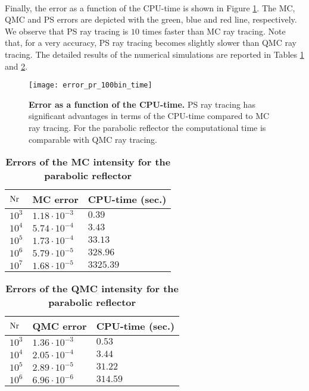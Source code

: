 \\ \indent
Finally, the error as a function of the CPU-time is shown in Figure \ref{fig:error_time_pr}. The MC, QMC and PS errors are depicted with the green, blue and red line, respectively. We observe that PS ray tracing is $10$ times faster than MC ray tracing. Note that, for a very accuracy, PS ray tracing becomes slightly slower than QMC ray tracing. The detailed results of the numerical simulations are reported in Tables \ref{tab:mc_error_pr_triangulation} and \ref{tab:QMC_error_pr_triangulation}.
\begin{figure}[h!]
  \center
  \texttt{[image: error\_pr\_100bin\_time]}
  \caption{\textbf{Error as a function of the CPU-time.} PS ray tracing has significant advantages in terms of the CPU-time compared to MC ray tracing. For the parabolic reflector the computational time is comparable with QMC ray tracing.}
  \label{fig:error_time_pr}
\end{figure} 
\begin{table}[ht] 
\centering
\caption{\bf Errors of the MC intensity for the parabolic reflector}
\begin{tabular}{lll}
 \hline   $\textrm{Nr}$ & MC error & CPU-time (sec.) \\
  \hline 
 $10^3$     & $1.18\cdot10^{-3}$ & $0.39$\\
 $10^4$     & $5.74\cdot 10^{-4}$ & $3.43$ \\
 $10^5$     & $1.73\cdot 10^{-4}$ & $33.13$\\
 $10^6$     & $5.79\cdot 10^{-5}$ & $328.96$\\
 $10^7$     & $1.68\cdot 10^{-5}$ & $3325.39$\\
 \hline
 \end{tabular}
 \label{tab:mc_error_pr_triangulation}
 \end{table}
\begin{table}[ht] 
\centering
\caption{\bf Errors of the QMC intensity for the parabolic reflector}
\begin{tabular}{lll}
 \hline   $\textrm{Nr}$ & QMC error & CPU-time (sec.) \\
  \hline 
 $10^3$     & $1.36\cdot10^{-3}$ & $0.53$\\
 $10^4$     & $2.05\cdot 10^{-4}$ & $3.44$ \\
 $10^5$     & $2.89\cdot 10^{-5}$ & $31.22$\\
 $10^6$     & $6.96\cdot 10^{-6}$ & $314.59$\\
 \hline
 \end{tabular}
 \label{tab:QMC_error_pr_triangulation}
 \end{table}
